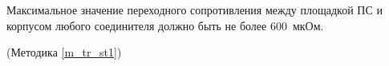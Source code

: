 Максимальное значение переходного сопротивления между площадкой ПС и корпусом любого соединителя должно быть не более 600~мкОм.

\begin{flushright}
(Методика \ref{m_tr_st1})
\end{flushright}

